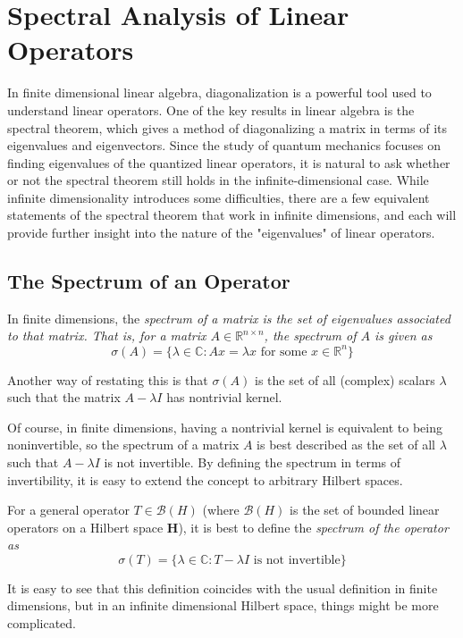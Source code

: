 \section{Spectral Analysis of Linear Operators}
In finite dimensional linear algebra, diagonalization is a powerful tool used to
understand linear operators. One of the key results in linear algebra is the
spectral theorem, which gives a method of diagonalizing a matrix in terms of its
eigenvalues and eigenvectors. Since the study of quantum mechanics focuses on
finding eigenvalues of the quantized linear operators, it is natural to ask
whether or not the spectral theorem still holds in the infinite-dimensional
case. While infinite dimensionality introduces some difficulties, there are a
few equivalent statements of the spectral theorem that work in infinite
dimensions, and each will provide further insight into the nature of the
"eigenvalues" of linear operators.

\subsection{The Spectrum of an Operator}
In finite dimensions, the \em spectrum \em of a matrix is the set of eigenvalues
associated to that matrix. That is, for a matrix $A \in \mathbb{R}^{n\times n}$,
the spectrum of $A$ is given as
\[
    \sigma(A) = \{\lambda \in \mathbb{C} : Ax=\lambda x \text{ for some } x \in
    \mathbb{R}^{n}\}
\]

Another way of restating this is that $\sigma(A)$ is the set of all (complex)
scalars $\lambda$ such that the matrix $A-\lambda I$ has nontrivial kernel.

Of course, in finite dimensions, having a nontrivial kernel is equivalent to
being noninvertible, so the spectrum of a matrix $A$ is best described as the
set of all $\lambda$ such that $A-\lambda I$ is not invertible. By defining the
spectrum in terms of invertibility, it is easy to extend the concept to
arbitrary Hilbert spaces.

For a general operator $T \in \mathscr{B}(H)$ (where $\mathscr{B}(H)$ is the set
of bounded linear operators on a Hilbert space \textbf{H}), it is best to define
the \em spectrum \em of the operator as
\[
    \sigma (T) = \{\lambda \in \mathbb{C} : T-\lambda I \text{ is not
    invertible}\}\]

It is easy to see that this definition coincides with the usual definition in
finite dimensions, but in an infinite dimensional Hilbert space, things might be
more complicated.

